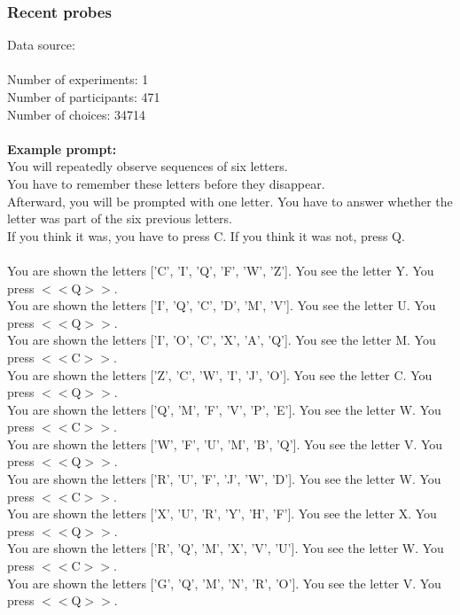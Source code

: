 \documentclass[pdflatex,sn-nature]{sn-jnl}%
\theoremstyle{thmstyleone}%
\theoremstyle{thmstyletwo}%
\theoremstyle{thmstylethree}%
\begin{document}
\subsubsection*{Recent probes}
Data source: \cite{enkavi2019large} \\ $~$ \\
Number of experiments: 1 $~$\\ 
Number of participants: 471 $~$\\ 
Number of choices: 34714 $~$\\ 
 $~$\\ 
\textbf{Example prompt:}
 $~$\\ 
You will repeatedly observe sequences of six letters. $~$\\ 
You have to remember these letters before they disappear. $~$\\ 
Afterward, you will be prompted with one letter. You have to answer whether the letter was part of the six previous letters. $~$\\ 
If you think it was, you have to press C. If you think it was not, press Q. $~$\\ 
 $~$\\ 
You are shown the letters ['C', 'I', 'Q', 'F', 'W', 'Z']. You see the letter Y. You press $<<$Q$>>$. $~$\\ 
You are shown the letters ['I', 'Q', 'C', 'D', 'M', 'V']. You see the letter U. You press $<<$Q$>>$. $~$\\ 
You are shown the letters ['I', 'O', 'C', 'X', 'A', 'Q']. You see the letter M. You press $<<$C$>>$. $~$\\ 
You are shown the letters ['Z', 'C', 'W', 'I', 'J', 'O']. You see the letter C. You press $<<$Q$>>$. $~$\\ 
You are shown the letters ['Q', 'M', 'F', 'V', 'P', 'E']. You see the letter W. You press $<<$C$>>$. $~$\\ 
You are shown the letters ['W', 'F', 'U', 'M', 'B', 'Q']. You see the letter V. You press $<<$Q$>>$. $~$\\ 
You are shown the letters ['R', 'U', 'F', 'J', 'W', 'D']. You see the letter W. You press $<<$C$>>$. $~$\\ 
You are shown the letters ['X', 'U', 'R', 'Y', 'H', 'F']. You see the letter X. You press $<<$Q$>>$. $~$\\ 
You are shown the letters ['R', 'Q', 'M', 'X', 'V', 'U']. You see the letter W. You press $<<$C$>>$. $~$\\ 
You are shown the letters ['G', 'Q', 'M', 'N', 'R', 'O']. You see the letter V. You press $<<$Q$>>$. $~$\\ 
\end{document}
